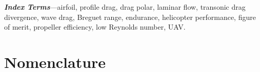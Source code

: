 \documentclass[10pt,a4paper,twocolumn]{article}
\begin{document}
\par\endgroup\smallskip

\begingroup\small\bfseries

\textbf{\emph{Index Terms}}---airfoil, profile drag, drag polar, laminar
flow, transonic drag divergence, wave drag, Breguet range, endurance,
helicopter performance, figure of merit, propeller efficiency, low
Reynolds number, UAV.

\par\endgroup\smallskip

\hypertarget{nomenclature}{%
\section*{Nomenclature}\label{nomenclature}}
\end{document}
